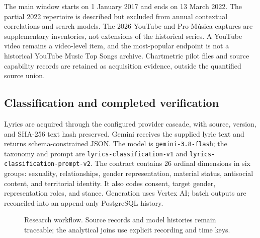 \documentclass[10pt,a4paper,twocolumn]{article}
\begin{document}
The main window starts on 1 January 2017 and ends on 13 March 2022. The partial 2022 repertoire is described but excluded from annual contextual correlations and search models. The 2026 YouTube and Pro-M\'usica captures are supplementary inventories, not extensions of the historical series. A YouTube video remains a video-level item, and the most-popular endpoint is not a historical YouTube Music Top Songs archive. Chartmetric pilot files and source capability records are retained as acquisition evidence, outside the quantified source union.

\subsection{Classification and completed verification}
Lyrics are acquired through the configured provider cascade, with source, version, and SHA-256 text hash preserved. Gemini receives the supplied lyric text and returns schema-constrained JSON. The model is \texttt{gemini-3.8-flash}; the taxonomy and prompt are \texttt{lyrics-classification-v1} and \texttt{lyrics-classification-prompt-v2}. The contract contains 26 ordinal dimensions in six groups: sexuality, relationships, gender representation, material status, antisocial content, and territorial identity. It also codes consent, target gender, representation roles, and stance. Generation uses Vertex AI; batch outputs are reconciled into an append-only PostgreSQL history.

\begin{figure}[t]
\centering
{}
\caption{Research workflow. Source records and model histories remain traceable; the analytical joins use explicit recording and time keys.}
\label{fig:workflow}
\end{figure}
\end{document}
